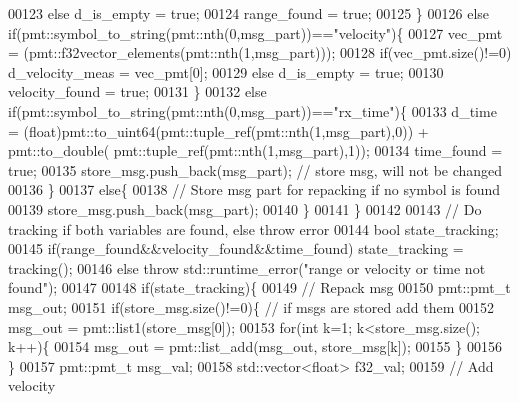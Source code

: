 \begin{DoxyCode}
00123                 \textcolor{keywordflow}{else} d_is_empty = \textcolor{keyword}{true};
00124                 range\_found = \textcolor{keyword}{true};
00125             \}
00126             \textcolor{keywordflow}{else} \textcolor{keywordflow}{if}(pmt::symbol\_to\_string(pmt::nth(0,msg\_part))==\textcolor{stringliteral}{"velocity"})\{
00127                 vec\_pmt = (pmt::f32vector\_elements(pmt::nth(1,msg\_part)));
00128                 \textcolor{keywordflow}{if}(vec\_pmt.size()!=0) d_velocity_meas = vec\_pmt[0];
00129                 \textcolor{keywordflow}{else} d_is_empty = \textcolor{keyword}{true};
00130                 velocity\_found = \textcolor{keyword}{true};
00131             \}
00132             \textcolor{keywordflow}{else} \textcolor{keywordflow}{if}(pmt::symbol\_to\_string(pmt::nth(0,msg\_part))==\textcolor{stringliteral}{"rx\_time"})\{
00133                 d_time = (float)pmt::to\_uint64(pmt::tuple\_ref(pmt::nth(1,msg\_part),0)) + pmt::to\_double(
      pmt::tuple\_ref(pmt::nth(1,msg\_part),1));
00134                 time\_found = \textcolor{keyword}{true};
00135                 store\_msg.push\_back(msg\_part); \textcolor{comment}{// store msg, will not be changed}
00136             \}
00137             \textcolor{keywordflow}{else}\{
00138                 \textcolor{comment}{// Store msg part for repacking if no symbol is found}
00139                 store\_msg.push\_back(msg\_part);
00140             \}
00141         \}
00142         
00143         \textcolor{comment}{// Do tracking if both variables are found, else throw error}
00144         \textcolor{keywordtype}{bool} state\_tracking;
00145         \textcolor{keywordflow}{if}(range\_found&&velocity\_found&&time\_found) state\_tracking = tracking();
00146         \textcolor{keywordflow}{else} \textcolor{keywordflow}{throw} std::runtime\_error(\textcolor{stringliteral}{"range or velocity or time not found"});
00147         
00148         \textcolor{keywordflow}{if}(state\_tracking)\{
00149             \textcolor{comment}{// Repack msg}
00150             pmt::pmt\_t msg\_out;
00151             \textcolor{keywordflow}{if}(store\_msg.size()!=0)\{ \textcolor{comment}{// if msgs are stored add them}
00152                 msg\_out = pmt::list1(store\_msg[0]);
00153                 \textcolor{keywordflow}{for}(\textcolor{keywordtype}{int} k=1; k<store\_msg.size(); k++)\{
00154                     msg\_out = pmt::list\_add(msg\_out, store\_msg[k]);
00155                 \}
00156             \}
00157             pmt::pmt\_t msg\_val;
00158             std::vector<float> f32\_val;
00159             \textcolor{comment}{// Add velocity}

\end{DoxyCode}
